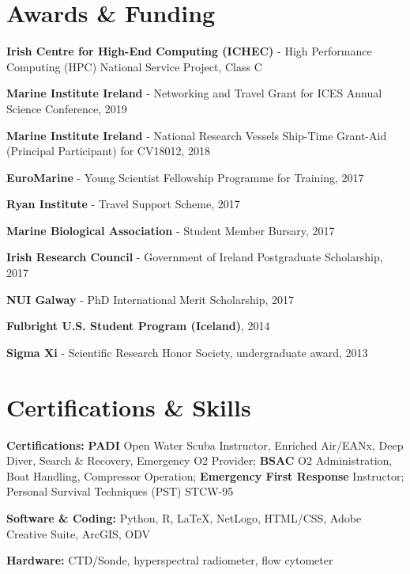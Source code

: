 \documentclass[a4paper]{deedy-resume} %
\begin{document}
\begin{flushleft}
\section{Awards \& Funding}
\sectionspace

\begin{tightitemize}
\item  \textbf{Irish Centre for High-End Computing (ICHEC)} - High Performance Computing (HPC) National Service Project, Class C
\item \textbf{Marine Institute Ireland} - Networking and Travel Grant for ICES Annual Science Conference, 2019
\item \textbf{Marine Institute Ireland} - National Research Vessels Ship-Time Grant-Aid (Principal Participant) for CV18012, 2018
\item \textbf{EuroMarine} - Young Scientist Fellowship Programme for Training, 2017
\item \textbf{Ryan Institute} - Travel Support Scheme, 2017
\item \textbf{Marine Biological Association} - Student Member Bursary, 2017
\item \textbf{Irish Research Council} - Government of Ireland Postgraduate Scholarship, 2017
\item \textbf{NUI Galway} - PhD International Merit Scholarship, 2017
\item \textbf{Fulbright U.S. Student Program (Iceland)}, 2014
\item \textbf{Sigma Xi} - Scientific Research Honor Society, undergraduate award, 2013
\end{tightitemize}

\sectionspace %



\section{Certifications \& Skills}
\sectionspace

\begin{tightitemize}
\item \textbf{Certifications:} \textbf{PADI} Open Water Scuba Instructor, Enriched Air/EANx, Deep Diver, Search \& Recovery, Emergency O2 Provider; \textbf{BSAC} O2 Administration, Boat Handling, Compressor Operation; \textbf{Emergency First Response} Instructor; Personal Survival Techniques (PST) STCW-95 %
\item \textbf{Software \& Coding:} Python, R, \LaTeX, NetLogo, HTML/CSS, Adobe Creative Suite, ArcGIS, ODV
\item \textbf{Hardware:} CTD/Sonde, hyperspectral radiometer, flow cytometer
\end{tightitemize}


\end{flushleft}
\end{document}
